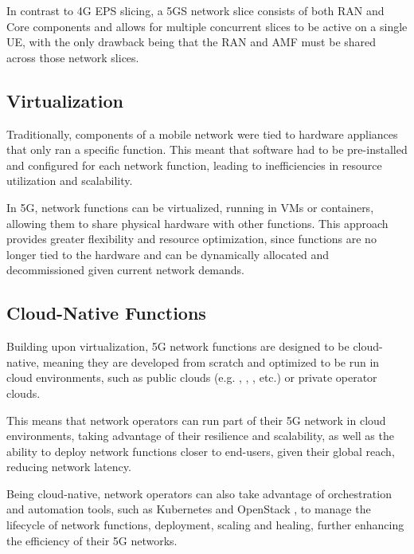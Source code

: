 In contrast to 4G EPS slicing, a 5GS network slice consists of both \gls{RAN} and Core components and allows for multiple concurrent slices to be active on a single \gls{UE}, with the only drawback being that the \gls{RAN} and \gls{AMF} must be shared across those network slices. 
\subsection{Virtualization}
\label{sec:virtualization}
Traditionally, components of a mobile network were tied to hardware appliances that only ran a specific function. This meant that software had to be pre-installed and configured for each network function, leading to inefficiencies in resource utilization and scalability.

In 5G, network functions can be virtualized, running in \glspl{VM} or containers, allowing them to share physical hardware with other functions. This approach provides greater flexibility and resource optimization, since functions are no longer tied to the hardware and can be dynamically allocated and decommissioned given current network demands. 
\subsection{Cloud-Native Functions}
\label{sec:cloud-native_functions}
Building upon virtualization, 5G network functions are designed to be cloud-native, meaning they are developed from scratch and optimized to be run in cloud environments, such as public clouds (e.g. , , , etc.) or private operator clouds. 

This means that network operators can run part of their 5G network in cloud environments, taking advantage of their resilience and scalability, as well as the ability to deploy network functions closer to end-users, given their global reach, reducing network latency.

Being cloud-native, network operators can also take advantage of orchestration and automation tools, such as Kubernetes and OpenStack \cite{mamushiane2023deploying}, to manage the lifecycle of network functions, deployment, scaling and healing, further enhancing the efficiency of their 5G networks.
